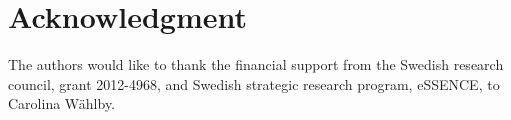 \documentclass[journal]{IEEEtran}
\begin{document}








%




\section*{Acknowledgment}


The authors would like to thank the financial support from the Swedish research council, grant 2012-4968, and Swedish strategic research program, eSSENCE, to Carolina W\"ahlby.

\end{document}

